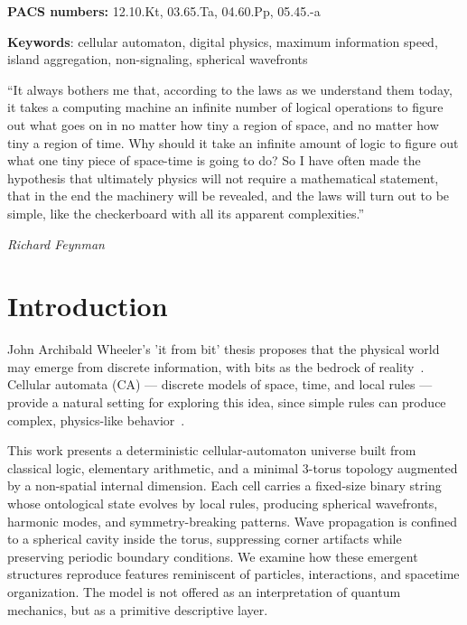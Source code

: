 \documentclass[a4paper]{article}
\begin{document}
\begin{center}
\textbf{PACS numbers: }12.10.Kt, 03.65.Ta, 04.60.Pp, 05.45.-a
\par\end{center}
\begin{center}
\textbf{Keywords}: cellular automaton, digital physics, maximum information speed, island aggregation, non-signaling, spherical wavefronts
\par\end{center}
\epigraph{``It always bothers me that, according to the laws as we understand them today, it takes a computing machine an infinite number of logical operations to figure out what goes on in no matter how tiny a region of space, and no matter how tiny a region of time. Why should it take an infinite amount of logic to figure out what one tiny piece of space-time is going to do? So I have often made the hypothesis that ultimately physics will not require a mathematical statement, that in the end the machinery will be revealed, and the laws will turn out to be simple, like the checkerboard with all its apparent complexities.''}{\textit{Richard Feynman}}
\section{Introduction}
John Archibald Wheeler's 'it from bit' thesis proposes that the physical world may emerge from discrete information, with bits as the bedrock of reality~\cite{wheeler}. Cellular automata (CA) --- discrete models of space, time, and local rules --- provide a natural setting for exploring this idea, since simple rules can produce complex, physics-like behavior~\cite{wolfram,zuse,fredkin}.

This work presents a deterministic cellular-automaton universe built from classical logic, elementary arithmetic, and a minimal 3-torus topology augmented by a non-spatial internal dimension. Each cell carries a fixed-size binary string whose ontological state evolves by local rules, producing spherical wavefronts, harmonic modes, and symmetry-breaking patterns. Wave propagation is confined to a spherical cavity inside the torus, suppressing corner artifacts while preserving periodic boundary conditions. We examine how these emergent structures reproduce features reminiscent of particles, interactions, and spacetime organization. The model is not offered as an interpretation of quantum mechanics, but as a primitive descriptive layer.
\end{document}
